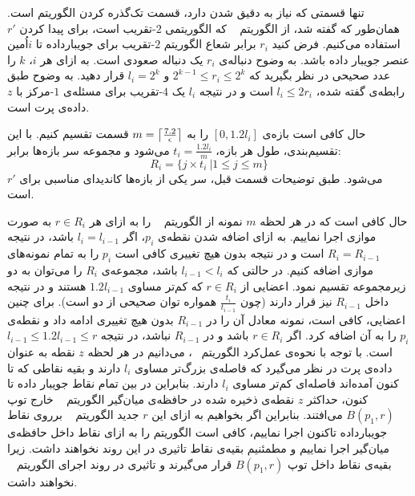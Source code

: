  تنها قسمتی که نیاز به دقیق شدن دارد، قسمت تک‌گذره کردن الگوریتم است. همان‌طور که گفته شد، از الگوریتم ~ که الگوریتمی $2$-تقریب است، برای پیدا کردن $r'$ استفاده می‌کنیم. فرض کنید $r_i$ برابر شعاع الگوریتم $2$-تقریب برای جویبارداده تا $i$اُمین عنصر جویبار داده باشد. به وضوح دنباله‌ی $r_i$ یک دنباله صعودی است. به ازای هر $i$، $k$ را عدد صحیحی در نظر بگیرید که $2^{k-1} \leq r_i \leq 2^k$ و $l_i = 2^k$ قرار دهید. به وضوح طبق‌ رابطه‌ی گفته شده، $l_i \leq 2r_i$ است و در نتیجه $l_i$ یک $4$-تقریب برای مسئله‌ی $1$-مرکز  با $z$ داده‌ی پرت است.
 
 حال کافی است بازه‌ی $[0, 1.2l_i]$ را به $m = \left\lceil{\frac{7.2}{\epsilon}}\right\rceil$ قسمت تقسیم کنیم. با این تقسیم‌بندی، طول هر بازه، $t_i = \frac{1.2l_i}{m}$ می‌شود و مجموعه سر بازه‌ها برابر:
 $$R_i = \{ j \times t_i \ | 1 \leq j \leq m \}$$
 می‌شود. طبق توضیحات قسمت قبل، سر یکی از بازه‌ها کاندیدای مناسبی برای $r'$ است. 
 
 حال کافی است که در هر لحظه $m$ نمونه از الگوریتم ~ را به ازای هر $r \in R_i$ به صورت موازی اجرا نماییم. به ازای اضافه شدن نقطه‌ی $p_i$، اگر $l_i = l_{i-1}$ باشد، در نتیجه $R_i = R_{i-1}$ است و در نتیجه بدون هیچ تغییری کافی است $p_i$ را به تمام نمونه‌های موازی اضافه کنیم. در حالتی که $l_{i-1} < l_{i}$ باشد، مجموعه‌ی $R_i$ را می‌توان به دو زیرمجموعه تقسیم نمود. اعضایی از $r \in R_i$ که کم‌تر مساوی $1.2l_{i-1}$ هستند و در نتیجه داخل $R_{i-1}$ نیز قرار دارند (چون $\frac{t_i}{t_{i-1}}$ همواره توان صحیحی از دو است). برای چنین اعضایی، کافی است، نمونه معادل‌ آن را در $R_{i-1}$ بدون هیچ تغییری ادامه داد و نقطه‌ی $p_i$ را به آن اضافه کرد. اگر $r \in R_i$ باشد و در $R_{i-1}$ نباشد، در نتیجه $l_{i-1} \leq 1.2l_{i-1} \leq r$ است. با توجه با نحوه‌ی عمل‌کرد الگوریتم ~، می‌دانیم در هر لحظه $z$ نقطه به عنوان داده‌ی پرت در نظر می‌گیرد که فاصله‌ی بزرگ‌تر مساوی $l_i$ دارند و بقیه نقاطی که تا کنون آمده‌اند فاصله‌ای کم‌تر مساوی $l_i$ دارند. بنابراین در بین تمام نقاط جویبار داده تا کنون، حداکثر $z$ نقطه‌ی ذخیره شده در حافظه‌ی میان‌گیر الگوریتم ~ خارج توپ $B(p_1, r)$ می‌افتند. بنابراین اگر بخواهیم به ازای این $r$ جدید الگوریتم ~ برروی نقاط جویبارداده تاکنون اجرا نماییم، کافی است الگوریتم را به ازای نقاط داخل حافظه‌ی میان‌گیر اجرا نماییم و مطمئنیم بقیه‌ی نقاط تاثیری در این روند نخواهند داشت. زیرا بقیه‌ی نقاط داخل توپ $B(p_1, r)$ قرار می‌گیرند و تاثیری در روند اجرای الگوریتم ~ نخواهند داشت. 
 
